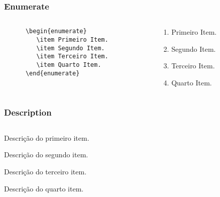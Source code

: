 
\begin{frame}[fragile]
  \frametitle{Enumerate}

  \begin{columns}
    \begin{column}[l]{5cm}
     \begin{verbatim}
      \begin{enumerate}
         \item Primeiro Item.
         \item Segundo Item.
         \item Terceiro Item.
         \item Quarto Item.
      \end{enumerate}
  \end{verbatim}

    \end{column}

    \begin{column}[r]{5cm}
      \begin{enumerate}
         \item Primeiro Item.
         \item Segundo Item.
         \item Terceiro Item.
         \item Quarto Item.
      \end{enumerate}
    \end{column}
  \end{columns}
\end{frame}


\begin{frame}[fragile]
  \frametitle{Description}

    \begin{block}{}
      \inputminted[fontsize=\scriptsize]{tex}{codes/07-description.tex}
    \end{block}

    \begin{block}{}
       \begin{description}
          \item [Primeiro Item] Descrição do primeiro item.
          \item [Segundo Item] Descrição do segundo item.
          \item [Terceiro Item] Descrição do terceiro item.
          \item [Quarto Item]  Descrição do quarto item.
       \end{description}
   \end{block}

\end{frame}


